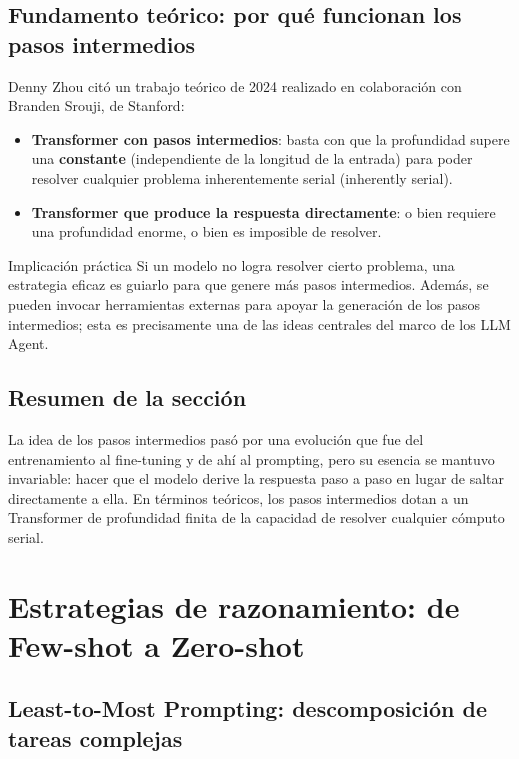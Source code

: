 \documentclass[a4paper]{article}
\begin{document}
\subsection{Fundamento teórico: por qué funcionan los pasos intermedios}

Denny Zhou citó un trabajo teórico de 2024 realizado en colaboración con Branden Srouji, de Stanford:

\begin{itemize}
    \item \textbf{Transformer con pasos intermedios}: basta con que la profundidad supere una \textbf{constante} (independiente de la longitud de la entrada) para poder resolver cualquier problema inherentemente serial (inherently serial).
    \item \textbf{Transformer que produce la respuesta directamente}: o bien requiere una profundidad enorme, o bien es imposible de resolver.
\end{itemize}

\begin{warningbox}{Implicación práctica}
Si un modelo no logra resolver cierto problema, una estrategia eficaz es guiarlo para que genere más pasos intermedios. Además, se pueden invocar herramientas externas para apoyar la generación de los pasos intermedios; esta es precisamente una de las ideas centrales del marco de los LLM Agent.
\end{warningbox}

\subsection{Resumen de la sección}

La idea de los pasos intermedios pasó por una evolución que fue del entrenamiento al fine-tuning y de ahí al prompting, pero su esencia se mantuvo invariable: hacer que el modelo derive la respuesta paso a paso en lugar de saltar directamente a ella. En términos teóricos, los pasos intermedios dotan a un Transformer de profundidad finita de la capacidad de resolver cualquier cómputo serial.

\section{Estrategias de razonamiento: de Few-shot a Zero-shot}

\subsection{Least-to-Most Prompting: descomposición de tareas complejas}
\end{document}
